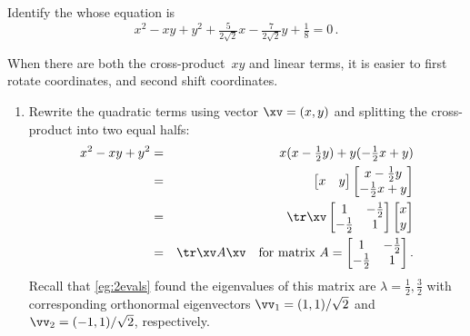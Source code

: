 \begin{example} \label{eg:cstrrc2}
Identify the  whose equation is
\begin{equation*}
x^2-xy+y^2+\tfrac5{2\sqrt2}x-\tfrac7{2\sqrt2}y+\tfrac18=0\,.
\end{equation*}
\begin{solution} 
When there are both the cross-product~\(xy\) and linear terms, it is  easier to first rotate coordinates, and second shift coordinates. 
\begin{enumerate}
\item Rewrite the quadratic terms using vector \(\xv=(x,y)\) and splitting the cross-product into two equal halfs:
\begin{eqnarray*}
x^2-xy+y^2
&=&x(x-\tfrac12y)+y(-\tfrac12x+y)
\\&=&\begin{bmatrix} x&y \end{bmatrix}
\begin{bmatrix} x-\tfrac12y\\-\tfrac12x+y \end{bmatrix}
\\&=&\tr\xv 
\begin{bmatrix} 1&-\tfrac12\\-\tfrac12&1 \end{bmatrix}
\begin{bmatrix} x\\y \end{bmatrix}
\\&=&\tr\xv A\xv
\quad\text{for matrix }A=
\begin{bmatrix} 1&-\tfrac12\\-\tfrac12&1 \end{bmatrix}.
\end{eqnarray*}
Recall that \autoref{eg:2evals} found the eigenvalues of this matrix are \(\lambda=\tfrac12,\tfrac32\) with corresponding orthonormal eigenvectors \(\vv_1=(1,1)/\sqrt2\) and \(\vv_2=(-1,1)/\sqrt2\), respectively.
\def\temp#1{\begin{tikzpicture}
  \begin{axis}[footnotesize,font=\footnotesize ,axis equal image
  , xlabel={$x$}, ylabel={$y$}, axis lines=middle
  , xtick={-2,-1,1,2}, ytick={-2,-1,1,2}
  ]
  \addplot[brown,quiver={u=3,v=3},-stealth] coordinates {(-1,-1)};
  \node[brown,left] at (axis cs:2,2) {$x'$};
  \addplot[brown,quiver={u=0.707,v=0.707},-stealth,thick] coordinates {(0,0)};
  \node[brown,right] at (axis cs:0.707,0.707) {$\vec v_1$};
  \addplot[brown,quiver={u=-3.2,v=3.2},-stealth] coordinates {(1,-1)};

\end{axis}
\end{tikzpicture}}
\end{enumerate}
\end{solution}
\end{example}

